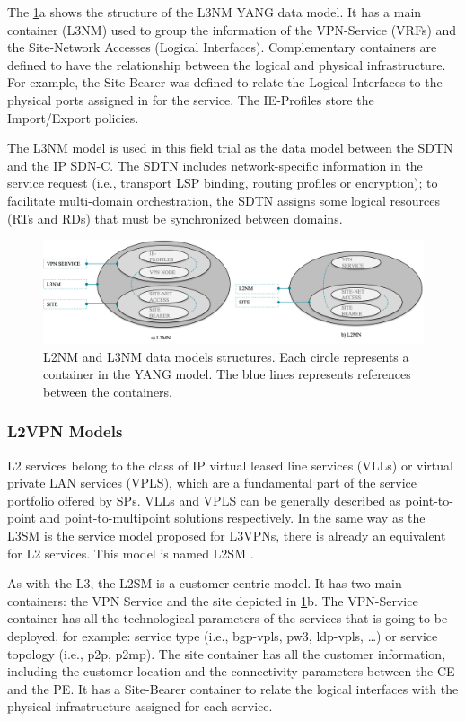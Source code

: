 \documentclass[a4paper,fleqn]{cas-dc}
\begin{document}
The \cref{FIG:l3nm}a shows the structure of the L3NM YANG data model. It has a  main container (L3NM) used to group the information of the VPN-Service (VRFs) and the Site-Network Accesses (Logical Interfaces). Complementary containers are defined to have the relationship between the logical and physical infrastructure. For example, the Site-Bearer was defined to relate the Logical Interfaces to the physical ports assigned in for the service. The IE-Profiles store the Import/Export policies.  

The L3NM model is used in this field trial as the data model between the SDTN and the IP SDN-C. The SDTN includes network-specific information in the service request (i.e., transport LSP binding, routing profiles or encryption); to facilitate multi-domain orchestration, the SDTN assigns some logical resources (RTs and RDs) that must be synchronized between domains.

\begin{figure}
	\centering
		\includegraphics[scale=0.55]{figs/L3NM_L2NM.png}
	\caption{L2NM and L3NM data models structures. Each circle represents a container in the YANG model. The blue lines represents references between the containers.}
	\label{FIG:l3nm} 
\end{figure}

\subsubsection{L2VPN Models}
\label{section:l2nm}

L2 services belong to the class of IP virtual leased line services (VLLs) or virtual private LAN services (VPLS)\cite{andersson2006framework}, which are a fundamental part of the service portfolio offered by SPs. VLLs and VPLS can be generally described as point-to-point and point-to-multipoint solutions respectively. In the same way as the L3SM is the service model proposed for L3VPNs, there is already an equivalent for L2 services. This model is named L2SM \cite{wen2018yang}. 

As with the L3, the L2SM is a customer centric model. It has two main containers: the VPN Service and the site depicted in \cref{FIG:l3nm}b. The VPN-Service container has all the technological parameters of the services that is going to be deployed, for example: service type (i.e., bgp-vpls, pw3, ldp-vpls, \dots) or service topology (i.e., p2p, p2mp). The site container has all the customer information, including the customer location and the connectivity parameters between the CE and the PE. It has a Site-Bearer container to relate the logical interfaces with the physical infrastructure assigned for each service.
\end{document}
